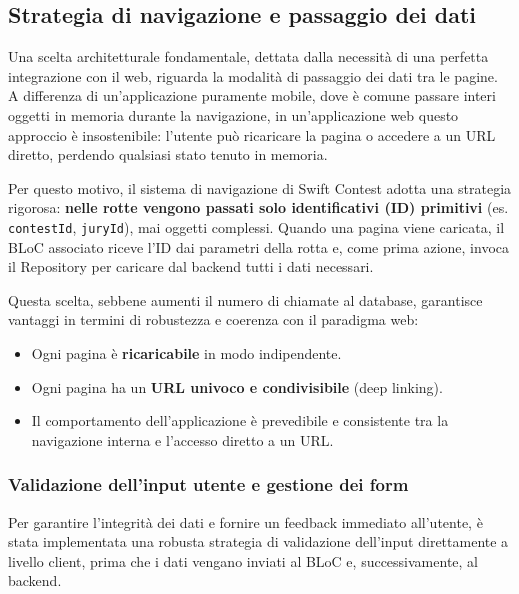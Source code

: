 \subsection{Strategia di navigazione e passaggio dei dati}\label{subsec:strategia-di-navigazione-e-passaggio-dei-dati}
Una scelta architetturale fondamentale, dettata dalla necessità di una perfetta integrazione con il web, riguarda la modalità di passaggio dei dati tra le pagine.
A differenza di un'applicazione puramente mobile, dove è comune passare interi oggetti in memoria durante la navigazione, in un'applicazione web questo approccio è insostenibile: l'utente può ricaricare la pagina o accedere a un URL diretto, perdendo qualsiasi stato tenuto in memoria.

Per questo motivo, il sistema di navigazione di Swift Contest adotta una strategia rigorosa: \textbf{nelle rotte vengono passati solo identificativi (ID) primitivi} (es. \texttt{contestId}, \texttt{juryId}), mai oggetti complessi.
Quando una pagina viene caricata, il BLoC associato riceve l'ID dai parametri della rotta e, come prima azione, invoca il Repository per caricare dal backend tutti i dati necessari.

Questa scelta, sebbene aumenti il numero di chiamate al database, garantisce vantaggi in termini di robustezza e coerenza con il paradigma web:
\begin{itemize}
	\item Ogni pagina è \textbf{ricaricabile} in modo indipendente.
    \item Ogni pagina ha un \textbf{URL univoco e condivisibile} (deep linking).
    \item Il comportamento dell'applicazione è prevedibile e consistente tra la navigazione interna e l'accesso diretto a un URL\@.
\end{itemize}

\subsubsection{Validazione dell'input utente e gestione dei form}
Per garantire l'integrità dei dati e fornire un feedback immediato all'utente, è stata implementata una robusta strategia di validazione dell'input direttamente a livello client, prima che i dati vengano inviati al BLoC e, successivamente, al backend.

